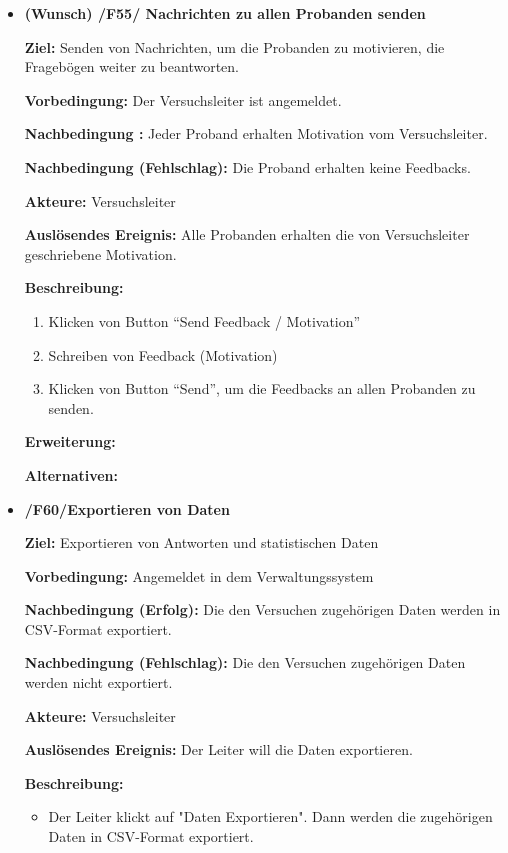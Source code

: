\documentclass[a4paper]{scrreprt}
\begin{document}
\begin{itemize}
                \item \textbf{(Wunsch) /F55/ Nachrichten zu allen \gls{Proband}en senden}
                \par \textbf{Ziel: }Senden von Nachrichten, um die \gls{Proband}en zu motivieren, die Fragebögen weiter zu beantworten.
                \par \textbf{Vorbedingung: }Der \gls{Versuchsleiter} ist angemeldet.
                \par \textbf{Nachbedingung : }Jeder \gls{Proband} erhalten Motivation vom \gls{Versuchsleiter}.
                \par \textbf{Nachbedingung (Fehlschlag): }Die \gls{Proband} erhalten keine Feedbacks.
                \par \textbf{Akteure: }\gls{Versuchsleiter}
                \par \textbf{Auslösendes Ereignis: }Alle \gls{Proband}en erhalten die von \gls{Versuchsleiter} geschriebene Motivation.
                \par \textbf{Beschreibung: }
                \begin{enumerate}
                    \item Klicken von Button ``Send Feedback / Motivation''
                    \item Schreiben von Feedback (Motivation)
                    \item Klicken von Button ``Send'', um die Feedbacks an allen \gls{Proband}en zu senden.
                \end{enumerate}
                \par \textbf{Erweiterung: }
                \par \textbf{Alternativen: }


                \item \textbf{/F60/Exportieren von Daten}

                \par \textbf{Ziel: }Exportieren von Antworten und statistischen Daten
                \par \textbf{Vorbedingung: }Angemeldet in dem Verwaltungssystem
                \par \textbf{Nachbedingung (Erfolg): }Die den Versuchen zugehörigen Daten werden in CSV-Format exportiert.
                \par \textbf{Nachbedingung (Fehlschlag): }Die den Versuchen zugehörigen Daten werden nicht exportiert.
                \par \textbf{Akteure: }\gls{Versuchsleiter}
                \par \textbf{Auslösendes Ereignis: }Der Leiter will die Daten exportieren.
                \par \textbf{Beschreibung: }
                \begin{itemize}
                    \item Der Leiter klickt auf "Daten Exportieren". Dann werden die zugehörigen Daten in CSV-Format exportiert.
                \end{itemize}
            \end{itemize}
\end{document}
